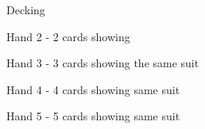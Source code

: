 \documentclass[green]{NeptuneBall}
\begin{document}
\name{\gDecking{}}

Decking

Hand 2 - 2 cards showing %

Hand 3 - 3 cards showing the same suit %

Hand 4 - 4 cards showing same suit %

Hand 5 - 5 cards showing same suit %
\end{document}
